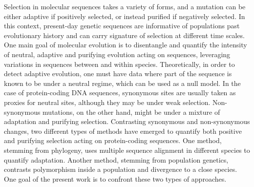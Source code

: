 \documentclass{article}
\begin{document}
Selection in molecular sequences takes a variety of forms, and a mutation can be either adaptive if positively selected, or instead purified if negatively selected.
In this context, present-day genetic sequences are informative of populations past evolutionary history and can carry signature of selection at different time scales.
One main goal of molecular evolution is to disentangle and quantify the intensity of neutral, adaptive and purifying evolution acting on sequences, leveraging variations in sequences between and within species.
Theoretically, in order to detect adaptive evolution, one must have data where part of the sequence is known to be under a neutral regime, which can be used as a null model.
In the case of protein-coding DNA sequences, synonymous sites are usually taken as proxies for neutral sites, although they may be under weak selection.
Non-synonymous mutations, on the other hand, might be under a mixture of adaptation and purifying selection.
Contrasting synonymous and non-synonymous changes, two different types of methods have emerged to quantify both positive and purifying selection acting on protein-coding sequences.
One method, stemming from phylogeny, uses multiple sequence alignment in different species to quantify adaptation.
Another method, stemming from population genetics, contrasts polymorphism inside a population and divergence to a close species.
One goal of the present work is to confront these two types of approaches.
\end{document}
